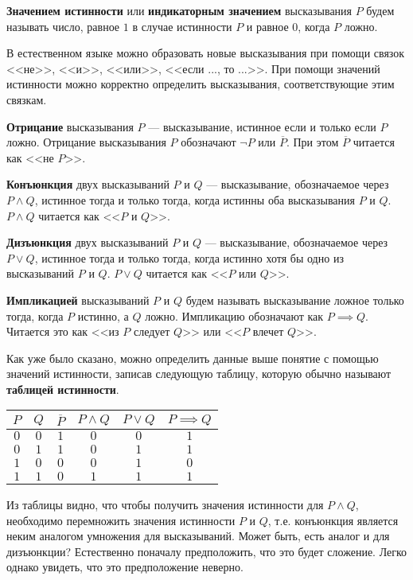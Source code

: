 \documentclass[12pt, russian]{article}
\begin{document}
\textbf{Значением истинности} или \textbf{индикаторным значением} высказывания $P$ будем называть число, равное $1$ в случае истинности $P$ и равное $0$, когда $P$ ложно.

В естественном языке можно образовать новые высказывания при помощи связок <<не>>, <<и>>, <<или>>, <<если ..., то ...>>. При помощи значений истинности можно корректно определить высказывания, соответствующие этим связкам.

\textbf{Отрицание} высказывания $P$ --- высказывание, истинное если  и только если $P$ ложно. Отрицание высказывания $P$ обозначают $\neg P$ или $\overline{P}$. При этом $\overline{P}$ читается как <<не $P$>>.

\textbf{Конъюнкция} двух высказываний $P$ и $Q$ --- высказывание, обозначаемое через $P \wedge Q$, истинное тогда и только тогда, когда истинны оба высказывания $P$ и $Q$. $P \wedge Q$ читается как <<$P$ и $Q$>>.

\textbf{Дизъюнкция} двух высказываний $P$ и $Q$ --- высказывание, обозначаемое через $P \vee Q$, истинное тогда и только тогда, когда истинно хотя бы одно из высказываний $P$ и $Q$. $P \vee Q$ читается как <<$P$ или $Q$>>. 

\textbf{Импликацией} высказываний $P$ и $Q$ будем называть высказывание ложное только тогда, когда $P$ истинно, а $Q$ ложно. Импликацию обозначают как $P \implies Q$. Читается это как <<из $P$ следует $Q$>> или <<$P$ влечет $Q$>>.

Как уже было сказано, можно определить данные выше понятие с помощью значений истинности, записав следующую таблицу, которую обычно называют \textbf{таблицей истинности}.

\begin{center}
\begin{tabular}{ |c|c|c|c|c|c| } 
	\hline
		$P$ & $Q$ & $\overline{P}$  & $P\wedge Q$ & $P \vee Q$ & $P \implies Q$\\ \hline
		$0$ & $0$ & $1$ & $0$ & $0$ & $1$ \\ \hline
		$0$ & $1$ & $1$ & $0$ & $1$ & $1$ \\ \hline
		$1$ & $0$ & $0$ & $0$ & $1$ & $0$ \\ \hline
		$1$ & $1$ & $0$ & $1$ & $1$ & $1$ \\
	\hline
\end{tabular}
\end{center}

Из таблицы видно, что чтобы получить значения истинности для $P \wedge Q$, необходимо перемножить значения истинности $P$ и $Q$, т.е. конъюнкция является неким аналогом умножения для высказываний. Может быть, есть аналог и для дизъюнкции? Естественно поначалу предположить, что это будет сложение. Легко однако увидеть, что это предположение неверно.
\end{document}
